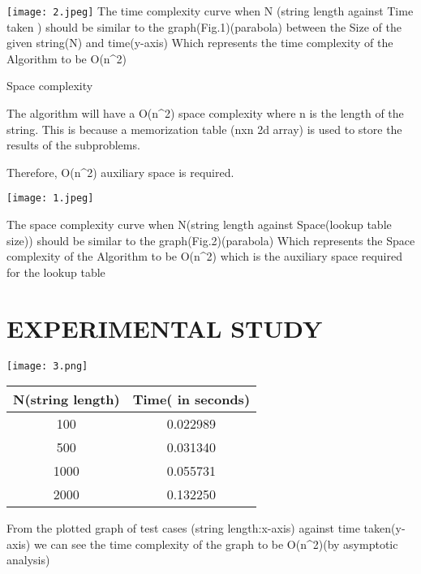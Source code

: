 \documentclass[twocolumn]{article}
\begin{document}
\texttt{[image: 2.jpeg]}
The time complexity curve when N (string length against Time taken ) should be similar to the graph(Fig.1)(parabola)  between the Size of the given string(N) and time(y-axis)
Which represents  the time complexity of the Algorithm to be O(n^2)

Space complexity

The algorithm will have a O(n^2) space complexity where n is the length of the string.  This is because a memorization table (nxn 2d array) is used to store the results of the subproblems. 

Therefore,  O(n^2) auxiliary space is required.

\texttt{[image: 1.jpeg]}

The space complexity curve when N(string length against Space(lookup table size)) should be similar to the graph(Fig.2)(parabola)
Which represents  the Space complexity
 of the Algorithm to be O(n^2) which is the auxiliary space required for the lookup table

\section{ EXPERIMENTAL STUDY
}
\texttt{[image: 3.png]}

\begin{center}
	\begin{tabular}{ |c | c | }
	\hline
	
N(string length)&
Time( in seconds)



 \\
	 \hline

100&
0.022989

\\
	\hline

500&
0.031340

\\
\hline

1000&
0.055731

\\
\hline

2000&
0.132250

\\
\hline
	\end{tabular}
\end{center}

From the plotted graph of  test cases (string length:x-axis) against time taken(y-axis)  we can see the time complexity of the graph to be O(n^2)(by asymptotic analysis)
\end{document}
